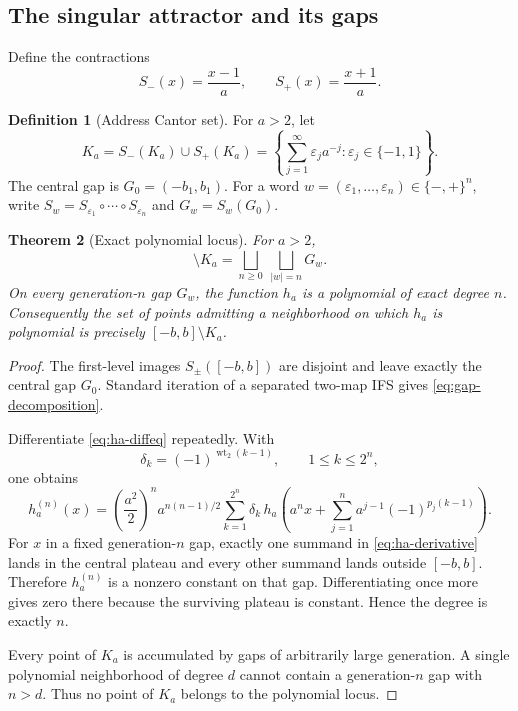 \documentclass[11pt,oneside]{article}
\newtheorem{theorem}{Theorem}[section]
\theoremstyle{definition}
\newtheorem{definition}[theorem]{Definition}
\theoremstyle{remark}
\newcommand{\wt}{\operatorname{wt}_2}
\newcommand{\eps}{\varepsilon}
\begin{document}
\subsection{The singular attractor and its gaps}

Define the contractions
\begin{equation}
 S_-(x)=\frac{x-1}{a},\qquad S_+(x)=\frac{x+1}{a}.
 \label{eq:IFS-maps}
\end{equation}

\begin{definition}[Address Cantor set]
\label{def:Ka}
For $a>2$, let
\begin{equation}
 K_a=S_-(K_a)\cup S_+(K_a)
 =\left\{\sum_{j=1}^{\infty}\eps_j a^{-j}:\eps_j\in\{-1,1\}\right\}.
 \label{eq:Ka}
\end{equation}
The central gap is $G_0=(-b_1,b_1)$.  For a word
$w=(\eps_1,\ldots,\eps_n)\in\{-,+\}^n$, write
$S_w=S_{\eps_1}\circ\cdots\circ S_{\eps_n}$ and
$G_w=S_w(G_0)$.
\end{definition}

\begin{theorem}[Exact polynomial locus]
\label{thm:polynomial-locus}
For $a>2$,
\begin{equation}
 [-b,b]\setminus K_a=\bigsqcup_{n\ge0}\ \bigsqcup_{|w|=n}G_w.
 \label{eq:gap-decomposition}
\end{equation}
On every generation-$n$ gap $G_w$, the function $h_a$ is a polynomial of exact degree $n$.
Consequently the set of points admitting a neighborhood on which $h_a$ is polynomial is
precisely $[-b,b]\setminus K_a$.
\end{theorem}

\begin{proof}
The first-level images $S_\pm([-b,b])$ are disjoint and leave exactly the central gap $G_0$.
Standard iteration of a separated two-map IFS gives \eqref{eq:gap-decomposition}.

Differentiate \eqref{eq:ha-diffeq} repeatedly.  With
\begin{equation}
 \delta_k=(-1)^{\wt(k-1)},\qquad 1\le k\le2^n,
 \label{eq:delta-TM}
\end{equation}
one obtains
\begin{equation}
 h_a^{(n)}(x)=
 \left(\frac{a^2}{2}\right)^n a^{n(n-1)/2}
 \sum_{k=1}^{2^n}\delta_k\,
 h_a\!\left(a^nx+\sum_{j=1}^{n}a^{j-1}(-1)^{p_j(k-1)}\right).
 \tag{S3.49}
 \label{eq:ha-derivative}
\end{equation}
For $x$ in a fixed generation-$n$ gap, exactly one summand in
\eqref{eq:ha-derivative} lands in the central plateau and every other summand lands outside
$[-b,b]$.  Therefore $h_a^{(n)}$ is a nonzero constant on that gap.  Differentiating once
more gives zero there because the surviving plateau is constant.  Hence the degree is
exactly $n$.

Every point of $K_a$ is accumulated by gaps of arbitrarily large generation.  A single
polynomial neighborhood of degree $d$ cannot contain a generation-$n$ gap with $n>d$.
Thus no point of $K_a$ belongs to the polynomial locus.
\end{proof}
\end{document}
